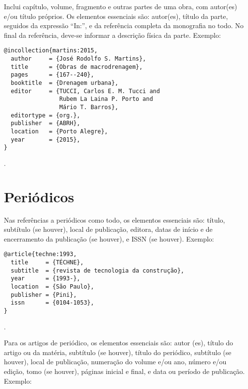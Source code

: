 Inclui capítulo, volume, fragmento e outras partes de uma obra, com autor(es) e/ou título próprios.
Os elementos essenciais são: autor(es), título da parte, seguidos da expressão ``In:'', e da referência completa da monografia no todo. No final da referência, deve-se informar a descrição física da parte.
Exemplo:

\vspace*{1em}

\begin{Verbatim}[frame=single]
@incollection{martins:2015,
  author     = {José Rodolfo S. Martins},
  title      = {Obras de macrodrenagem},
  pages      = {167--240},
  booktitle  = {Drenagem urbana},
  editor     = {TUCCI, Carlos E. M. Tucci and
                Rubem La Laina P. Porto and
                Mário T. Barros},
  editortype = {org.},
  publisher  = {ABRH},
  location   = {Porto Alegre},
  year       = {2015},
}
\end{Verbatim}

\noindent
{}.

\section{Periódicos}

Nas referências a periódicos como todo, os elementos essenciais são: título, subtítulo (se houver), local de publicação, editora, datas de início e de encerramento da publicação (se houver), e ISSN (se houver).
Exemplo:

\vspace*{1em}

\begin{Verbatim}[frame=single]
@article{techne:1993,
  title     = {TÉCHNE},
  subtitle  = {revista de tecnologia da construção},
  year      = {1993-},
  location  = {São Paulo},
  publisher = {Pini},
  issn      = {0104-1053},
}
\end{Verbatim}

\noindent
{}.

\vspace*{1em}

Para os artigos de periódico, os elementos essenciais são: autor (es), título do artigo ou da matéria, subtítulo (se houver), título do periódico, subtítulo (se houver), local de publicação, numeração do volume e/ou ano, número e/ou edição, tomo (se houver), páginas inicial e final, e data ou período de publicação.
Exemplo:

\vspace*{1em}

